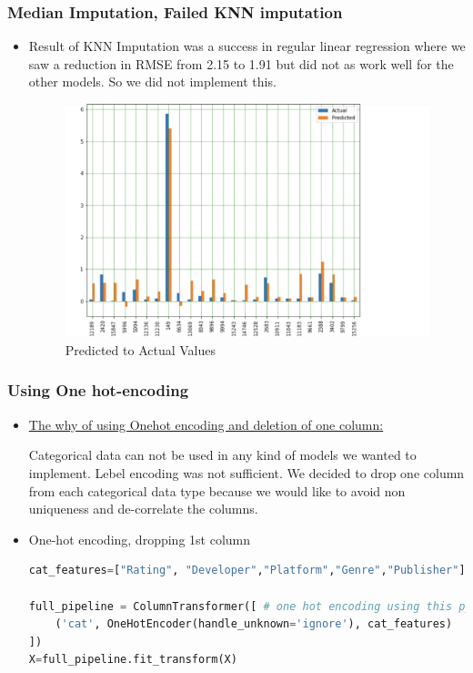 \begin{frame}[fragile]
    \frametitle{Median Imputation, Failed KNN imputation}
    \begin{itemize}
    \item Result of KNN Imputation was a success in regular linear regression where we saw a reduction in RMSE from 2.15 to 1.91 but did not as work well for the other models. So we did not implement this. 
    \n
    \begin{figure}[H]
        \centering
        \includegraphics[scale=0.25]{graphs/improvement.png}
        \caption{Predicted to Actual Values}
        \label{fig:N20}
    \end{figure}
    \end{itemize}
\end{frame}


\begin{frame}[fragile]
    \frametitle{Using One hot-encoding}
    \begin{itemize}
        \item \underline {The why of using Onehot encoding and deletion of one column:} 
        
        \n 
        \n 
        Categorical data can not be used in any kind of models we wanted to implement. Lebel encoding was not sufficient. We decided to drop one column from each categorical data type because we would like to avoid non uniqueness and de-correlate the columns.  
        \item One-hot encoding, dropping 1st column 
    \begin{lstlisting}[language=Python]
    cat_features=["Rating", "Developer","Platform","Genre","Publisher"]

full_pipeline = ColumnTransformer([ # one hot encoding using this python pipeline function. very useful. Analogous to a design matrix
    ('cat', OneHotEncoder(handle_unknown='ignore'), cat_features)
])
X=full_pipeline.fit_transform(X)
    \end{lstlisting}
    \end{itemize}
\end{frame}
